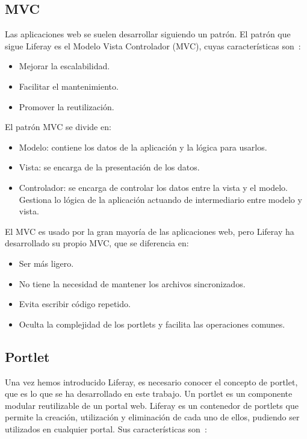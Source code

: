 \documentclass[a4paper, 12pt]{book}
\begin{document}
\vspace{5mm}
\subsection{MVC}
\label{subsec:mvc}
Las aplicaciones web se suelen desarrollar siguiendo un patrón. El patrón que sigue Liferay es el Modelo Vista Controlador (MVC), cuyas características son~\cite{liferay_dev_tutorials}:
\begin{itemize}
\item Mejorar la escalabilidad.
\item Facilitar el mantenimiento.
\item Promover la reutilización.
\end{itemize}

El patrón MVC se divide en:
\begin{itemize}
\item Modelo: contiene los datos de la aplicación y la lógica para usarlos.
\item Vista: se encarga de la presentación de los datos.
\item Controlador: se encarga de controlar los datos entre la vista y el modelo. Gestiona lo lógica de la aplicación actuando de intermediario entre modelo y vista.
\end{itemize}

\vspace{5mm}
El MVC es usado por la gran mayoría de las aplicaciones web, pero Liferay ha desarrollado su propio MVC, que se diferencia en:

\begin{itemize}
\item Ser más ligero.
\item No tiene la necesidad de mantener los archivos sincronizados.
\item Evita escribir código repetido.
\item Oculta la complejidad de los portlets y facilita las operaciones comunes.
\end{itemize}


\subsection{Portlet}
\label{subsec:portlet}
Una vez hemos introducido Liferay, es necesario conocer el concepto de portlet, que es lo que se ha desarrollado en este trabajo. Un portlet es un componente modular reutilizable de un portal web. Liferay es un contenedor de portlets que permite la creación, utilización y eliminación de cada uno de ellos, pudiendo ser utilizados en cualquier portal. Sus características son~\cite{portlet_ibm}: 
\end{document}
